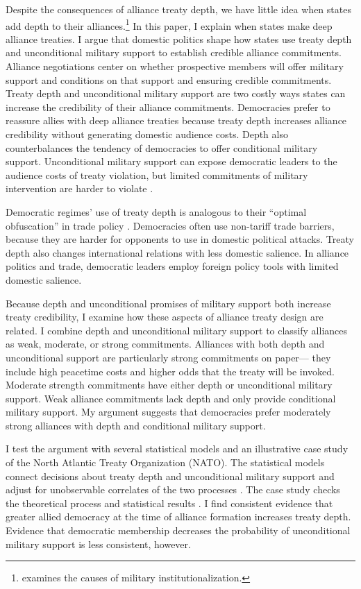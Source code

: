 \documentclass[12pt]{article}
\begin{document}
Despite the consequences of alliance treaty depth, we have little idea when states add depth to their alliances.\footnote{\citet{Mattes2012} examines the causes of military institutionalization.}
In this paper, I explain when states make deep alliance treaties.
I argue that domestic politics shape how states use treaty depth and unconditional military support to establish credible alliance commitments. 
Alliance negotiations center on whether prospective members will offer military support and conditions on that support \citep{Poast2019a} and ensuring credible commitments. 
Treaty depth and unconditional military support are two costly ways states can increase the credibility of their alliance commitments.
Democracies prefer to reassure allies with deep alliance treaties because treaty depth increases alliance credibility without generating domestic audience costs.
Depth also counterbalances the tendency of democracies to offer conditional military support. 
Unconditional military support can expose democratic leaders to the audience costs of treaty violation, but limited commitments of military intervention are harder to violate \citep{Mattes2012, Chibaetal2015}.


Democratic regimes' use of treaty depth is analogous to their ``optimal obfuscation'' in trade policy \citep{Kono2006}.
Democracies often use non-tariff trade barriers, because they are harder for opponents to use in domestic political attacks.
Treaty depth also changes international relations with less domestic salience.  
In alliance politics and trade, democratic leaders employ foreign policy tools with limited domestic salience.  


Because depth and unconditional promises of military support both increase treaty credibility, I examine how these aspects of alliance treaty design are related. 
I combine depth and unconditional military support to classify alliances as weak, moderate, or strong commitments. 
Alliances with both depth and unconditional support are particularly strong commitments on paper--- they include high peacetime costs and higher odds that the treaty will be invoked. 
Moderate strength commitments have either depth or unconditional military support.
Weak alliance commitments lack depth and only provide conditional military support.  
My argument suggests that democracies prefer moderately strong alliances with depth and conditional military support.  


I test the argument with several statistical models and an illustrative case study of the North Atlantic Treaty Organization (NATO).
The statistical models connect decisions about treaty depth and unconditional military support and adjust for unobservable correlates of the two processes \citep{Braumoelleretal2018}. 
The case study checks the theoretical process and statistical results \citep{SeawrightGerring2008, Seawright2016}. 
I find consistent evidence that greater allied democracy at the time of alliance formation increases treaty depth.
Evidence that democratic membership decreases the probability of unconditional military support is less consistent, however. 
\end{document}
